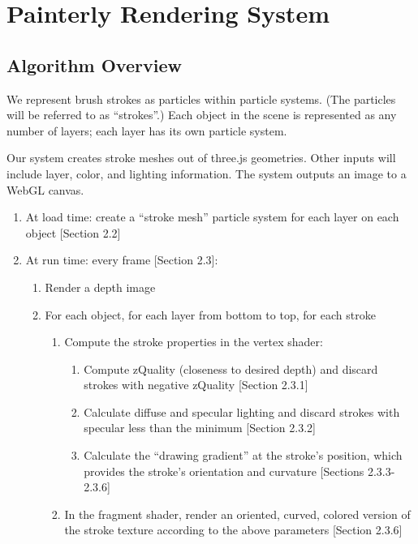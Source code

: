 \documentclass[conference]{acmsiggraph}
\begin{document}
\section{Painterly Rendering System}

\subsection{Algorithm Overview}

We represent brush strokes as particles within particle systems. (The particles
will be referred to as ``strokes''.) Each object in the scene is represented as
any number of layers; each layer has its own particle system.

Our system creates stroke meshes out of three.js geometries. Other inputs will
include layer, color, and lighting information. The system outputs an image to
a WebGL canvas.

\begin{enumerate}
  \item At load time: create a ``stroke mesh'' particle system for each layer
    on each object {[}Section 2.2{]}

  \item At run time: every frame {[}Section 2.3{]}:

      \begin{enumerate}
        \item Render a depth image
        \item For each object, for each layer from bottom to top, for each
          stroke

          \begin{enumerate}
            \item Compute the stroke properties in the vertex shader:

              \begin{enumerate}
                \item Compute zQuality (closeness to desired depth) and discard
                  strokes with negative zQuality {[}Section 2.3.1{]}
                \item Calculate diffuse and specular lighting and discard
                  strokes with specular less than the minimum
                  {[}Section 2.3.2{]}
                \item Calculate the ``drawing gradient'' at the stroke's
                  position, which provides the stroke's orientation and
                  curvature {[}Sections 2.3.3-2.3.6{]}
              \end{enumerate}

            \item In the fragment shader, render an oriented, curved, colored
              version of the stroke texture according to the above parameters
              {[}Section 2.3.6{]}

          \end{enumerate}

      \end{enumerate}

\end{enumerate}
\end{document}
